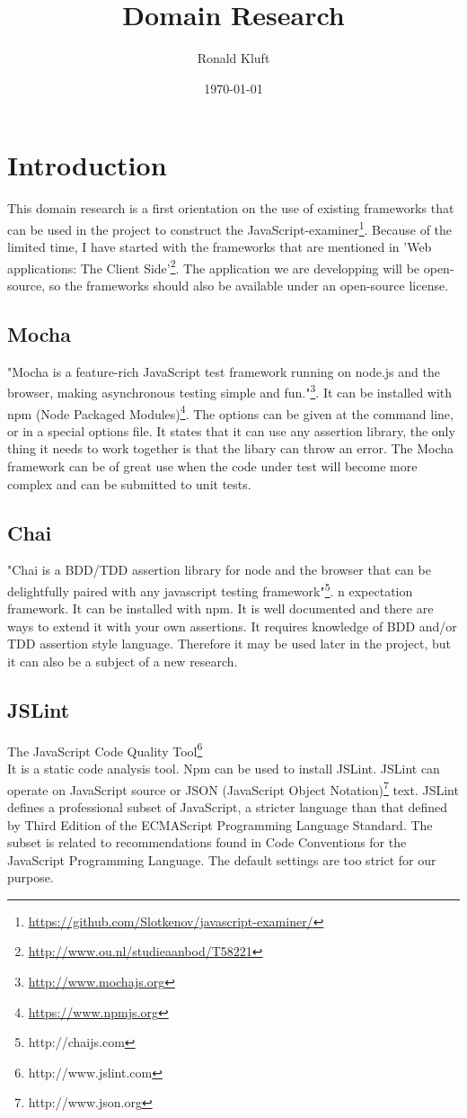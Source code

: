 \documentclass{article}
\begin{document}
\title{Domain Research}
\author{Ronald Kluft}
\date{\today}
\maketitle

\section{Introduction}
This domain research is a first orientation on the use of existing frameworks that can be used in the 
project to construct the JavaScript-examiner\footnote{\url{https://github.com/Slotkenov/javascript-examiner/}}.
Because of the limited time, I have started with the frameworks that are mentioned in 
'Web applications: The Client Side'\footnote{\url{http://www.ou.nl/studieaanbod/T58221}}.
The application we are developping will be open-source, so the frameworks should also be available
under an open-source license.

\subsection{Mocha}
"Mocha is a feature-rich JavaScript test framework running on node.js and the 
browser, making asynchronous testing simple and fun."\footnote{\url{http://www.mochajs.org}}.
It can be installed with npm (Node Packaged Modules)\footnote{\url{https://www.npmjs.org}}.
The options can be given at the command line, or in a special options file.
It states that it can use any assertion library, the only thing it needs to work together is that the libary can throw an error.
The Mocha framework can be of great use when the code under test will become more complex and can be submitted to unit tests.

\subsection{Chai}
"Chai is a BDD/TDD assertion library for node and the browser that can be delightfully paired with any javascript testing framework"\footnote{http://chaijs.com}.
n expectation framework. It can be installed with npm.
It is well documented and there are ways to extend it with your own assertions.
It requires knowledge of BDD and/or TDD assertion style language.
Therefore it may be used later in the project, but it can also be a subject of a new research.


\subsection{JSLint}
The JavaScript Code Quality Tool\footnote{http://www.jslint.com}\\
It is a static code analysis tool.
Npm can be used to install JSLint.
JSLint can operate on JavaScript source or JSON (JavaScript Object Notation)\footnote {http://www.json.org} text.
JSLint defines a professional subset of JavaScript, a stricter language than that defined by Third Edition of the ECMAScript Programming Language Standard.
The subset is related to recommendations found in Code Conventions for the JavaScript Programming Language.
The default settings are too strict for our purpose.
\end{document}
